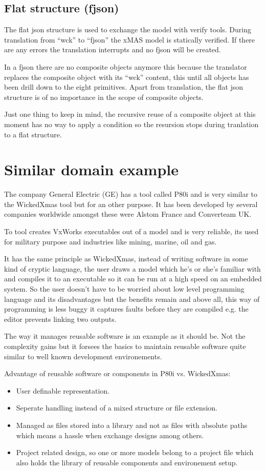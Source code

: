 \documentclass[a4paper,11pt,final]{article}
\begin{document}
\subsection{Flat structure (fjson)}
The flat json structure is used to exchange the model with verify tools.
During translation from ``wck'' to ``fjson'' the xMAS model is statically
verified. If there are any errors the translation interrupts and no
fjson will be created.

In a fjson there are no composite objects anymore this because the
translator replaces the composite object with its ``wck'' content,
this until all objects has been drill down to the eight primitives.
Apart from translation, the flat json structure is of no importance
in the scope of composite objects.

Just one thing to keep in mind, the recursive reuse of a composite
object at this moment has no way to apply a condition so the
resursion stops during tranlation to a flat structure.

\newpage
\section{Similar domain example}
The company General Electric (GE) has a tool called P80i and is very similar
to the WickedXmas tool but for an other purpose.
It has been developed by several companies worldwide amongst these
were Alstom France and Converteam UK.

To tool creates VxWorks executables out of a model and is very reliable,
its used for military purpose and industries like mining, marine, oil and gas.

It has the same principle as WickedXmas, instead of writing software
in some kind of cryptic language, the user draws a model which he's
or she's familiar with and compiles it to an executable so it can be run
at a high speed on an embedded system.
So the user doesn't have to be worried about low level programming
language and its disadvantages but the benefits remain and 
above all, this way of programming is less buggy it captures
faults before they are compiled e.g. the editor prevents linking
two outputs.

The way it manages reusable software is an example as it should be.
Not the complexity gains but it forsees the basics to maintain reusable
software quite similar to well known development environements. 

Advantage of reusable software or components in P80i vs. WickedXmas:
\begin{itemize}
\item User definable representation.
\item Seperate handling instead of a mixed structure or file extension.
\item Managed as files stored into a library and not as files with absolute
paths which means a hassle when exchange designs among others.
\item Project related design, so one or more models belong to a project file
which also holds the library of reusable components and environement setup.
\end{itemize}
\end{document}
